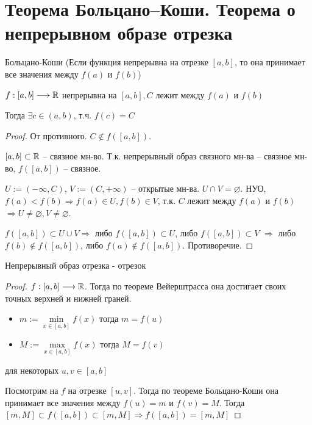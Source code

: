 
\section{Теорема Больцано–Коши. Теорема о непрерывном образе отрезка}
\begin{theorem-non}
    Больцано-Коши (Если функция непрерывна на отрезке $[a, b]$, то она принимает все значения между $f(a)$ и $f(b)$)

    $f: [a, b] \longrightarrow \mathbb{R}$ непрерывна на $[a, b], C$ лежит между $f(a)$ и $f(b)$

    Тогда $\exists c\in (a, b)$, т.ч. $f(c) = C$
    \begin{proof} От противного. $C \notin f([a, b])$.

        $[a, b] \subset \mathbb{R}$ -- связное мн-во. Т.к. непрерывный образ связного 
        мн-ва -- связное мн-во, $f([a, b])$ -- связное. 
    
        $U := (-\infty, C)$, $V := (C, +\infty)$ -- открытые мн-ва.
        $U \cap V = \varnothing$. НУО, $f(a) < f(b) \Rightarrow
        f(a) \in U, f(b) \in V$, т.к. $C$ лежит между $f(a)$ и $f(b)$
        $\Rightarrow U \neq \varnothing, V \neq \varnothing$.
    
        $f([a, b]) \subset U \cup V \Rightarrow$ либо $f([a, b]) \subset U$,
        либо $f([a, b]) \subset V$ $\Rightarrow$ либо $f(b) \notin f([a, b])$,
        либо $f(a) \notin f([a, b])$. Противоречие.
    
    \end{proof}
\end{theorem-non}

\begin{theorem-non}
    Непрерывный образ отрезка - отрезок 

    \begin{proof} \quad

        $f:[a, b] \longrightarrow \mathbb{R}$.
        Тогда по теореме Вейерштрасса она достигает своих точных верхней и нижней граней.
        \begin{itemize}
            \item[] $m:= \min\limits_{x \in [a, b]}{f(x)}$ \qquad тогда $m = f(u)$
            \item[] $M:= \max\limits_{x \in [a, b]}{f(x)}$ \qquad тогда $M = f(v)$
        \end{itemize} для некоторых $u, v \in [a, b]$

        Посмотрим на $f$ на отрезке $[u, v]$. Тогда по теореме Больцано-Коши она принимает все значения между $f(u) = m$
        и $f(v) = M$. Тогда $[m, M] \subset f([a, b]) \subset [m, M] \Longrightarrow f([a, b]) = [m, M]$ 
    \end{proof}
\end{theorem-non}